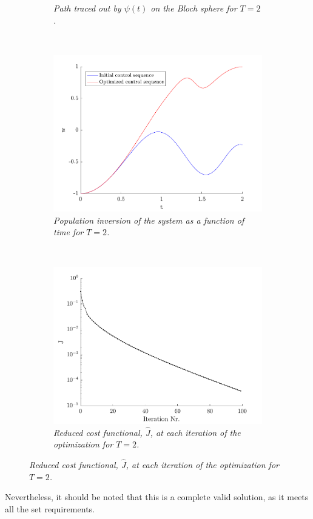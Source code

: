 \begin{figure}[h!]
\begin{subfigure}[t]{0.49\textwidth}
        \caption{\textit{Path traced out by $\psi (t)$ on the Bloch sphere for $T = 2$.}}
        \label{fig:path2}
    \end{subfigure}   
	~
    \begin{subfigure}[t]{0.49\textwidth}
        \includegraphics[width=\textwidth]{Figures/pop2.pdf}
        \caption{\textit{Population inversion of the system as a function of time for $T = 2$.}}
        \label{fig:population2}
    \end{subfigure}
    ~
    \begin{subfigure}[t]{0.49\textwidth}
        \includegraphics[width=\textwidth]{Figures/cost2.pdf}
        \caption{\textit{Reduced cost functional, $\hat{J}$, at each iteration of the optimization for $T = 2$.}}
        \label{fig:cost2}
    \end{subfigure}     
\end{figure}
Nevertheless, it should be noted that this is a complete valid solution, as it meets all the set requirements.